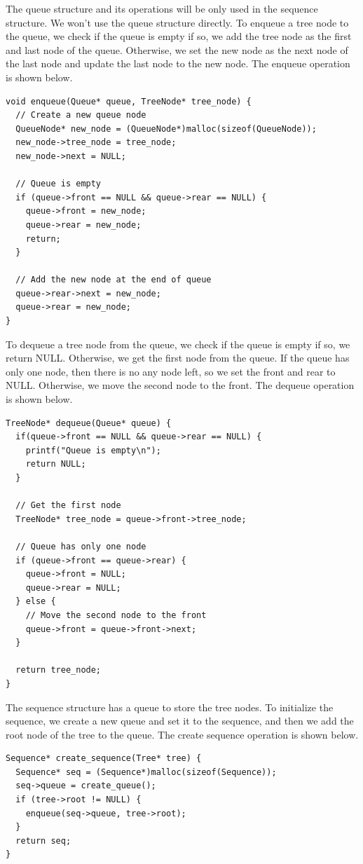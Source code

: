 \documentclass[a4paper,11pt]{article}
\begin{document}
The queue structure and its operations will be only used in the sequence structure. We won't use
the queue structure directly. To enqueue a tree node to the queue, we check if the queue is empty
if so, we add the tree node as the first and last node of the queue. Otherwise, we set the new node
as the next node of the last node and update the last node to the new node. The enqueue operation
is shown below.

\begin{verbatim}
void enqueue(Queue* queue, TreeNode* tree_node) {
  // Create a new queue node
  QueueNode* new_node = (QueueNode*)malloc(sizeof(QueueNode));
  new_node->tree_node = tree_node;
  new_node->next = NULL;

  // Queue is empty
  if (queue->front == NULL && queue->rear == NULL) {
    queue->front = new_node;
    queue->rear = new_node;
    return;
  }

  // Add the new node at the end of queue
  queue->rear->next = new_node;
  queue->rear = new_node;
}
\end{verbatim}

To dequeue a tree node from the queue, we check if the queue is empty if so, we return NULL. Otherwise,
we get the first node from the queue. If the queue has only one node, then there is no any node left,
so we set the front and rear to NULL. Otherwise, we move the second node to the front. The dequeue
operation is shown below.

\begin{verbatim}
TreeNode* dequeue(Queue* queue) {
  if(queue->front == NULL && queue->rear == NULL) {
    printf("Queue is empty\n");
    return NULL;
  }

  // Get the first node
  TreeNode* tree_node = queue->front->tree_node;

  // Queue has only one node
  if (queue->front == queue->rear) {
    queue->front = NULL;
    queue->rear = NULL;
  } else {
    // Move the second node to the front
    queue->front = queue->front->next;
  }
  
  return tree_node;
}
\end{verbatim}

The sequence structure has a queue to store the tree nodes. To initialize the sequence, we create a new
queue and set it to the sequence, and then we add the root node of the tree to the queue. The create
sequence operation is shown below.

\begin{verbatim}
Sequence* create_sequence(Tree* tree) {
  Sequence* seq = (Sequence*)malloc(sizeof(Sequence));
  seq->queue = create_queue();
  if (tree->root != NULL) {
    enqueue(seq->queue, tree->root);
  }
  return seq;
}
\end{verbatim}
\end{document}
